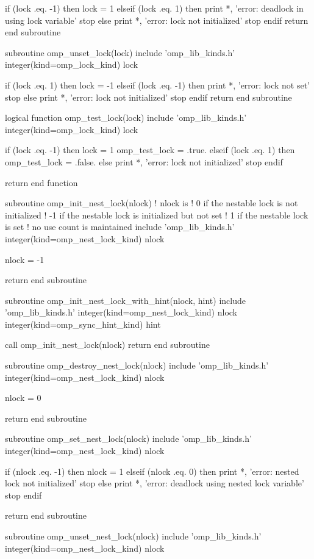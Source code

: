 {\begin{ompfFunction}
  if (lock .eq. -1) then
    lock = 1
  elseif (lock .eq. 1) then
    print *, 'error: deadlock in using lock variable'
    stop
  else
    print *, 'error: lock not initialized'
    stop
  endif
  return
end subroutine

subroutine omp_unset_lock(lock)
  include 'omp_lib_kinds.h'
  integer(kind=omp_lock_kind) lock

  if (lock .eq. 1) then
    lock = -1
  elseif (lock .eq. -1) then
    print *, 'error: lock not set'
    stop
  else
    print *, 'error: lock not initialized'
    stop
  endif
  return
end subroutine

logical function omp_test_lock(lock)
  include 'omp_lib_kinds.h'
  integer(kind=omp_lock_kind) lock

  if (lock .eq. -1) then
    lock = 1
    omp_test_lock = .true.
  elseif (lock .eq. 1) then
    omp_test_lock = .false.
  else
    print *, 'error: lock not initialized'
    stop
  endif

  return
end function

subroutine omp_init_nest_lock(nlock)
  ! nlock is
  ! 0 if the nestable lock is not initialized
  ! -1 if the nestable lock is initialized but not set
  ! 1 if the nestable lock is set
  ! no use count is maintained
  include 'omp_lib_kinds.h'
  integer(kind=omp_nest_lock_kind) nlock

  nlock = -1

  return
end subroutine

subroutine omp_init_nest_lock_with_hint(nlock, hint)
  include 'omp_lib_kinds.h'
  integer(kind=omp_nest_lock_kind) nlock
  integer(kind=omp_sync_hint_kind) hint

  call omp_init_nest_lock(nlock)
  return
end subroutine

subroutine omp_destroy_nest_lock(nlock)
  include 'omp_lib_kinds.h'
  integer(kind=omp_nest_lock_kind) nlock

  nlock = 0

  return
end subroutine

subroutine omp_set_nest_lock(nlock)
  include 'omp_lib_kinds.h'
  integer(kind=omp_nest_lock_kind) nlock

  if (nlock .eq. -1) then
    nlock = 1
  elseif (nlock .eq. 0) then
    print *, 'error: nested lock not initialized'
    stop
  else
    print *, 'error: deadlock using nested lock variable'
    stop
  endif

  return
end subroutine

subroutine omp_unset_nest_lock(nlock)
  include 'omp_lib_kinds.h'
  integer(kind=omp_nest_lock_kind) nlock


\end{ompfFunction}}

